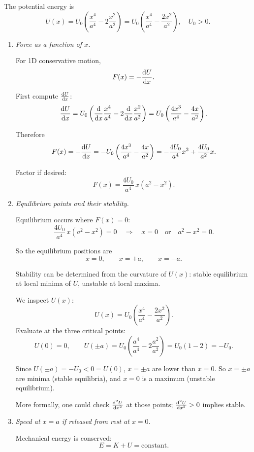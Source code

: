 \documentclass[12pt]{article}
\begin{document}
\begin{enumerate}
The potential energy is
\[
U(x) = U_0 \left( \frac{x^4}{a^4} - 2 \frac{x^2}{a^2} \right)
= U_0 \left( \frac{x^4}{a^4} - \frac{2x^2}{a^2} \right)
,
\quad U_0>0.
\]

\begin{enumerate}
    \item \textit{Force as a function of $x$.}

    For 1D conservative motion,
    \[
    F(x) = - \dv{U}{x}.
    \]

    First compute $\dv{U}{x}$:
    \[
    \dv{U}{x}
    = U_0 \left(
    \dv{x} \frac{x^4}{a^4}
    - 2 \dv{x} \frac{x^2}{a^2}
    \right)
    = U_0 \left(
    \frac{4x^3}{a^4}
    - \frac{4x}{a^2}
    \right).
    \]

    Therefore
    \[
    F(x) = -\dv{U}{x}
    = - U_0 \left(
    \frac{4x^3}{a^4}
    - \frac{4x}{a^2}
    \right)
    = - \frac{4U_0}{a^4} x^3 + \frac{4U_0}{a^2} x.
    \]

    Factor if desired:
    \[
    F(x) = \frac{4U_0}{a^4} \, x \left( a^2 - x^2 \right).
    \]

    \item \textit{Equilibrium points and their stability.}

    Equilibrium occurs where $F(x)=0$:
    \[
    \frac{4U_0}{a^4} \, x \left( a^2 - x^2 \right) = 0
    \quad\Longrightarrow\quad
    x=0 \quad \text{or} \quad a^2-x^2 = 0.
    \]

    So the equilibrium positions are
    \[
    x = 0, \qquad x = +a, \qquad x = -a.
    \]

    Stability can be determined from the curvature of $U(x)$: stable equilibrium at local minima of $U$, unstable at local maxima.

    We inspect $U(x)$:
    \[
    U(x) = U_0 \left(\frac{x^4}{a^4} - \frac{2x^2}{a^2}\right).
    \]
    Evaluate at the three critical points:
    \[
    U(0) = 0,
    \qquad
    U(\pm a) = U_0 \left( \frac{a^4}{a^4} - 2\frac{a^2}{a^2} \right)
    = U_0 (1 - 2)
    = -U_0.
    \]

    Since $U(\pm a) = -U_0 < 0 = U(0)$, $x=\pm a$ are lower than $x=0$. So $x=\pm a$ are minima (stable equilibria), and $x=0$ is a maximum (unstable equilibrium).

    More formally, one could check $\dv[2]{U}{x}$ at those points; $\dv[2]{U}{x} >0$ implies stable.

    \item \textit{Speed at $x=a$ if released from rest at $x=0$.}

    Mechanical energy is conserved:
    \[
    E = K + U = \text{constant}.
    \]


\end{enumerate}
\end{enumerate}
\end{document}
